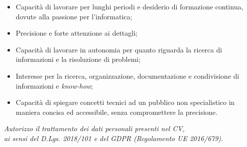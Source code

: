 \documentclass[12pt]{article}
\begin{document}
\begin{itemize}
\item Capacità di lavorare per lunghi periodi e desiderio di formazione continua, dovute alla passione per l'informatica;
\item Precisione e forte attenzione ai dettagli;
\item Capacità di lavorare in autonomia per quanto riguarda la ricerca di informazioni e la risoluzione di problemi;
\item Interesse per la ricerca, organizzazione, documentazione e condivisione di informazioni e \textit{know-how};
\item Capacità di spiegare concetti tecnici ad un pubblico non specialistico in maniera concisa ed accessibile, senza compromettere la precisione.
\end{itemize}

\vspace{0.616cm}

\begin{center}
\textit{Autorizzo il trattamento dei dati personali presenti nel CV,\\ai sensi del D.Lgs. 2018/101 e del GDPR (Regolamento UE 2016/679).}
\end{center}
\end{document}
